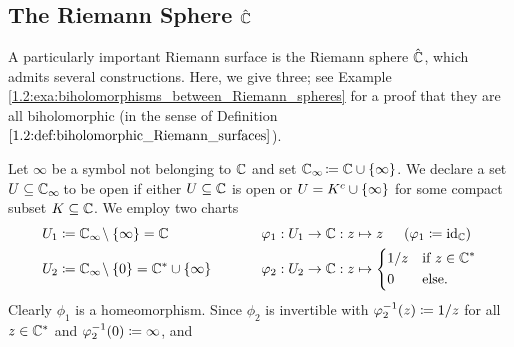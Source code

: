 \documentclass[../Moduli_Spaces_of_Riemann_Surfaces.tex]{subfiles}
\begin{document}
    \subsection{The Riemann Sphere $\hat{\mathbb{C}}$}
    A particularly important Riemann surface is the Riemann sphere $\hat{\mathbb{C}}$, which admits several constructions. Here, we give three; see Example \ref{1.2:exa:biholomorphisms_between_Riemann_spheres} for a proof that they are all biholomorphic (in the sense of Definition $\ref{1.2:def:biholomorphic_Riemann_surfaces}$).
    \begin{example}\label{1.1:exa:one_point_compactification_of_C}
        Let $\infty$ be a symbol not belonging to $\mathbb{C}$ and set $\mathbb{C}_\infty\!\coloneqq\mathbb{C}\cup\left\{\infty\right\}$. We declare a set $U\subseteq\mathbb{C}_\infty\!$ to be open if either $U\subseteq\mathbb{C}$ is open or $U=K^c\cup\left\{\infty\right\}$ for some compact subset $K\subseteq\mathbb{C}$. We employ two charts
        \begin{equation*}
            \begin{alignedat}{2}
                U_1&\coloneqq\C_\infty\!\comp\l\{\infty\r\}=\C\ \ \ \ \ \ \ \ \ \ \ \ \ \ \ \ \ \ \ \ &&\phi_1:U_1\to\C:z\mapsto z\ \ \ \ \l(\phi_1\coloneqq\id_\C\r) \\
                U_2&\coloneqq\C_\infty\!\comp\l\{0\r\}=\C^\ast\cup\l\{\infty\r\}&&\phi_2:U_2\to\C:z\mapsto
                \begin{dcases}
                    1/z & \textrm{if }z\in\C^\ast \\
                    0 & \textrm{else.}
                \end{dcases}
            \end{alignedat}
        \end{equation*}
        Clearly $\phi_1$ is a homeomorphism. Since $\phi_2$ is invertible with $\varphi_2^{-1}\!\left(z\right)\coloneqq1/z$ for all $z\in\mathbb{C}^\ast$ and $\varphi_2^{-1}\!\left(0\right)\coloneqq\infty$, and

\end{example}
\end{document}
